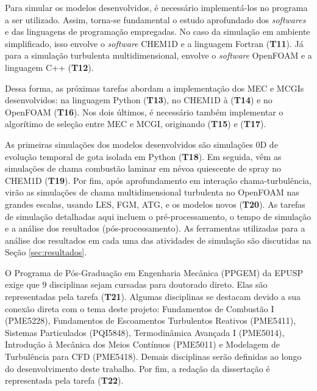 Para simular os modelos desenvolvidos, é necessário implementá-los no programa a ser utilizado.
Assim, torna-se fundamental o estudo aprofundado dos \emph{softwares} e das linguagens de programação empregadas. 
No caso da simulação em ambiente simplificado, isso envolve o \emph{software} CHEM1D e a linguagem Fortran (\textbf{T11}).
Já para a simulação turbulenta multidimensional, envolve o \emph{software} OpenFOAM e a linguagem C++ (\textbf{T12}).

Dessa forma, as próximas tarefas abordam a implementação dos MEC e MCGIs desenvolvidos: na linguagem Python  (\textbf{T13}), no  CHEM1D à  (\textbf{T14}) e no OpenFOAM  (\textbf{T16}).
Nos dois últimos, é necessário também implementar o algorítimo de seleção entre MEC e MCGI, originando (\textbf{T15}) e (\textbf{T17}).  

As primeiras simulações dos modelos desenvolvidos são simulações 0D de evolução temporal de gota isolada em Python (\textbf{T18}). 
Em seguida, vêm as simulações de chama combustão laminar em névoa quiescente de spray no CHEM1D (\textbf{T19}).
Por fim, após aprofundamento em interação chama-turbulência, virão as simulações de chama multidimensional turbulenta no OpenFOAM nas grandes escalas, usando LES, FGM, ATG, e os modelos novos (\textbf{T20}).
As tarefas de simulação detalhadas aqui incluem o pré-processamento, o tempo de simulação e a análise dos resultados (pós-processamento).
As ferramentas utilizadas para a análise dos resultados em cada uma das atividades de simulação são discutidas na Seção \ref{sec:resultados}.

O Programa de Pós-Graduação em Engenharia Mecânica (PPGEM) da EPUSP exige que 9 disciplinas sejam cursadas para doutorado direto.
Elas são representadas pela tarefa (\textbf{T21}).
Algumas disciplinas se destacam devido a sua conexão direta com o tema deste projeto: Fundamentos de Combustão I (PME5228), Fundamentos de Escoamentos Turbulentos Reativos (PME5411), Sistemas Particulados (PQI5848), Termodinâmica Avançada I (PME5014), Introdução à Mecânica dos Meios Contínuos (PME5011) e Modelagem de Turbulência para CFD (PME5418).
Demais disciplinas serão definidas ao longo do desenvolvimento deste trabalho.
Por fim, a redação da dissertação é representada pela tarefa (\textbf{T22}).



